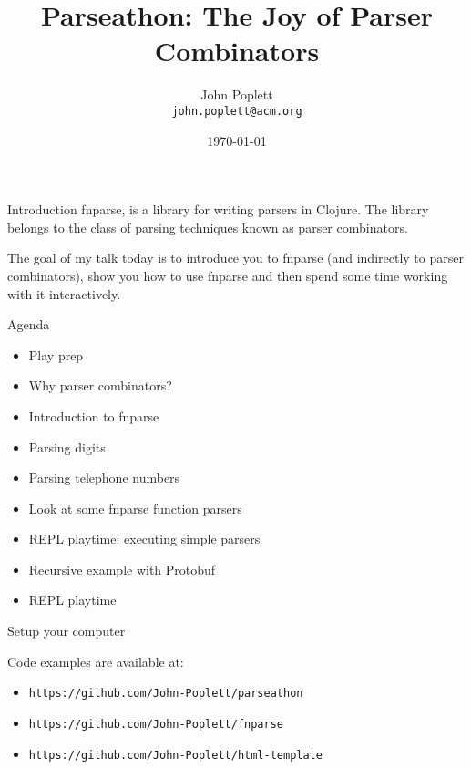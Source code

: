 \documentclass[presentation]{beamer}
\begin{document}
\title{Parseathon: The Joy of Parser Combinators}
\author{John Poplett\\
  \texttt{john.poplett@acm.org}}
\date{\today}

\begin{frame}[plain]
\titlepage
\end{frame}

\begin{frame}{Introduction}
fnparse, is a library for writing parsers in Clojure. The library
belongs to the class of parsing techniques known as parser combinators.

The goal of my talk today is to introduce you to fnparse (and
indirectly to parser combinators), show you how to use fnparse and
then spend some time working with it interactively.
\end{frame}

\begin{frame}{Agenda}

\begin{itemize}
\item Play prep
\item Why parser combinators?
\item Introduction to fnparse
\item Parsing digits
\item Parsing telephone numbers
\item Look at some fnparse function parsers
\item REPL playtime: executing simple parsers
\item Recursive example with Protobuf
\item REPL playtime
\end{itemize}

\end{frame}

\begin{frame}{Setup your computer}

Code examples are available at:

\begin{itemize}
\item \texttt{https://github.com/John-Poplett/parseathon}
\item \texttt{https://github.com/John-Poplett/fnparse}
\item \texttt{https://github.com/John-Poplett/html-template}
\end{itemize}

\end{frame}
\end{document}
